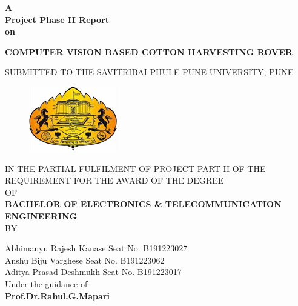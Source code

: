 \documentclass[12pt,a4paper]{report}
\begin{document}
\begin{titlepage}

\begin{center}

\large{\bf{A}\\
\bf{Project Phase II Report}\\
on}\\

\vspace*{0.2in}

\textbf{\Large{COMPUTER VISION BASED COTTON HARVESTING ROVER}}

\vspace*{0.2in}

\large{SUBMITTED TO THE SAVITRIBAI PHULE PUNE UNIVERSITY,  PUNE}
\end{center}

\begin{figure}[!htb]

\begin{center}

\includegraphics[scale=1.0]{images/logo/logo.png}

\end{center}
\end{figure}

\begin{center}

\large{{IN THE PARTIAL FULFILMENT OF PROJECT PART-II OF THE REQUIREMENT FOR THE AWARD OF THE DEGREE}\\{OF}\\ \textbf{BACHELOR OF ELECTRONICS \& TELECOMMUNICATION ENGINEERING}\\ {BY}}
\end{center}
\begin{center}
 
 Abhimanyu Rajesh Kanase
  \hspace*{0.2in} Seat No. B191223027
\\
 Anshu Biju Varghese
 \hspace*{0.5in} Seat No. B191223062
\\
 Aditya Prasad Deshmukh   
 \hspace*{0.3in} Seat No. B191223017
\\
Under the guidance of \\
\vspace*{0.1in}
\textbf{\large{Prof.Dr.Rahul.G.Mapari}}


\end{center}
\end{titlepage}
\end{document}
